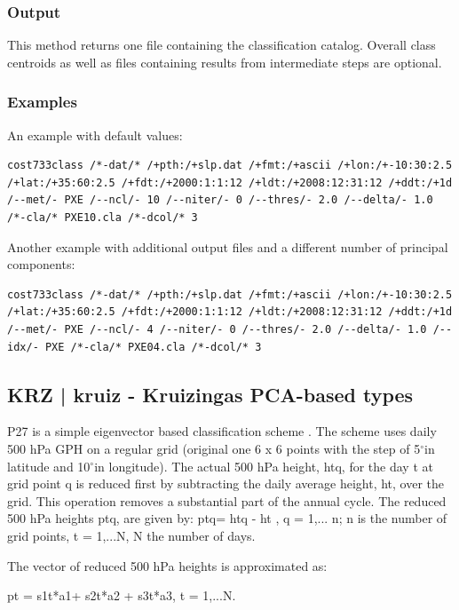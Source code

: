 \documentclass[12pt, oneside, a4paper, headsepline, plainheadsepline]{scrbook}
\newcommand{\degree}{\ensuremath{^\circ}}
\begin{document}
\subsubsection*{Output}
This method returns one file containing the classification catalog. 
Overall class centroids as well as files containing results from intermediate steps are optional.

\subsubsection*{Examples}
An example with default values:
\begin{lstlisting}
cost733class /*-dat/* /+pth:/+slp.dat /+fmt:/+ascii /+lon:/+-10:30:2.5 /+lat:/+35:60:2.5 /+fdt:/+2000:1:1:12 /+ldt:/+2008:12:31:12 /+ddt:/+1d /--met/- PXE /--ncl/- 10 /--niter/- 0 /--thres/- 2.0 /--delta/- 1.0 /*-cla/* PXE10.cla /*-dcol/* 3 
\end{lstlisting}
Another example with additional output files and a different number of principal components:
\begin{lstlisting}
cost733class /*-dat/* /+pth:/+slp.dat /+fmt:/+ascii /+lon:/+-10:30:2.5 /+lat:/+35:60:2.5 /+fdt:/+2000:1:1:12 /+ldt:/+2008:12:31:12 /+ddt:/+1d /--met/- PXE /--ncl/- 4 /--niter/- 0 /--thres/- 2.0 /--delta/- 1.0 /--idx/- PXE /*-cla/* PXE04.cla /*-dcol/* 3 
\end{lstlisting}

\subsection{KRZ | kruiz - Kruizingas PCA-based types}

P27 is a simple eigenvector based classification scheme \citep{Kruizinga1979,Buishand1997}. The scheme uses daily 500 hPa GPH on a regular grid (original one 6 x 6 points with the step of 5\degree in latitude and 10\degree in longitude). The actual 500 hPa height, htq, for the day t at grid point q is reduced first by subtracting the daily average height, ht, over the grid. This operation removes a substantial part of the annual cycle. The reduced 500 hPa heights ptq, are given by: 
ptq= htq - ht , q = 1,... n; n is the number of grid points, t = 1,...N, N the number of days. 

The vector of reduced 500 hPa heights is approximated as: 

pt = s1t*a1+ s2t*a2 + s3t*a3, t = 1,...N. 
\end{document}
